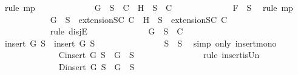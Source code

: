 \begin{isabellebody}
\ {\isacharparenleft}rule\ mp{\isacharparenright}\isanewline
\ \ \ \ \ \ \ \ \ \ \isamarkupfalse%
\ \isamarkupfalse%
\ {}{\isacharcolon}{\isachardoublequoteopen}{\isacharbraceleft}G{\isacharbraceright}\ {\isasymunion}\ S\ {\isasymin}\ C\ {\isasymor}\ {\isacharbraceleft}H{\isacharbraceright}\ {\isasymunion}\ S\ {\isasymin}\ C{\isachardoublequoteclose}\isanewline
\ \ \ \ \ \ \ \ \ \ \ \ \isamarkupfalse%
\ {\isacartoucheopen}F\ {\isasymin}\ S{\isacartoucheclose}\ \isamarkupfalse%
\ {\isacharparenleft}rule\ mp{\isacharparenright}\isanewline
\ \ \ \ \ \ \ \ \ \ \isamarkupfalse%
\ {\isachardoublequoteopen}{\isacharbraceleft}G{\isacharbraceright}\ {\isasymunion}\ S{\isacharprime}\ {\isasymin}\ {\isacharparenleft}extensionSC\ C{\isacharparenright}\ {\isasymor}\ {\isacharbraceleft}H{\isacharbraceright}\ {\isasymunion}\ S{\isacharprime}\ {\isasymin}\ {\isacharparenleft}extensionSC\ C{\isacharparenright}{\isachardoublequoteclose}\isanewline
\ \ \ \ \ \ \ \ \ \ \ \ \isamarkupfalse%
\ {}\isanewline
\ \ \ \ \ \ \ \ \ \ \isamarkupfalse%
\ {\isacharparenleft}rule\ disjE{\isacharparenright}\isanewline
\ \ \ \ \ \ \ \ \ \ \ \ \isamarkupfalse%
\ {\isachardoublequoteopen}{\isacharbraceleft}G{\isacharbraceright}\ {\isasymunion}\ S\ {\isasymin}\ C{\isachardoublequoteclose}\isanewline
\ \ \ \ \ \ \ \ \ \ \ \ \isamarkupfalse%
\ {\isachardoublequoteopen}insert\ G\ S{\isacharprime}\ {\isasymsubseteq}\ insert\ G\ S{\isachardoublequoteclose}\isanewline
\ \ \ \ \ \ \ \ \ \ \ \ \ \ \isamarkupfalse%
\ {\isacartoucheopen}S{\isacharprime}\ {\isasymsubseteq}\ S{\isacartoucheclose}\ \isamarkupfalse%
\ {\isacharparenleft}simp\ only{\isacharcolon}\ insert{\isacharunderscore}mono{\isacharparenright}\isanewline
\ \ \ \ \ \ \ \ \ \ \ \ \isamarkupfalse%
\ C{\isacharcolon}{\isachardoublequoteopen}insert\ G\ S{\isacharprime}\ {\isacharequal}\ {\isacharbraceleft}G{\isacharbraceright}\ {\isasymunion}\ S{\isacharprime}{\isachardoublequoteclose}\isanewline
\ \ \ \ \ \ \ \ \ \ \ \ \ \ \isamarkupfalse%
\ {\isacharparenleft}rule\ insert{\isacharunderscore}is{\isacharunderscore}Un{\isacharparenright}\isanewline
\ \ \ \ \ \ \ \ \ \ \ \ \isamarkupfalse%
\ D{\isacharcolon}{\isachardoublequoteopen}insert\ G\ S\ {\isacharequal}\ {\isacharbraceleft}G{\isacharbraceright}\ {\isasymunion}\ S{\isachardoublequoteclose}\isanewline
\ \ \ \ \ \ \ \ \ \ \ \ \ \ \isamarkupfalse%

\end{isabellebody}
